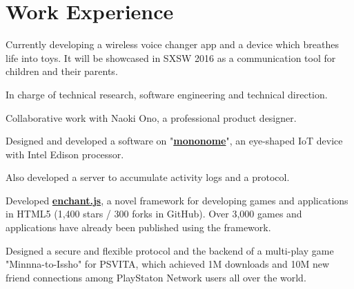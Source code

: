 \documentclass[letterpaper]{deedy-resume} %
\begin{document}
\begin{minipage}[t]{0.66\textwidth} %

\renewcommand{\baselinestretch}{0.93}


\section{Work Experience}

\vspace{4mm}
\begin{tightitemize}
\item Currently developing a wireless voice changer app and a device which breathes life into toys. It will be showcased in SXSW 2016 as a communication tool for children and their parents.
\item In charge of technical research, software engineering and technical direction.
\item Collaborative work with Naoki Ono, a professional product designer.
\end{tightitemize}

\vspace{2mm} %

\begin{tightitemize}
\item Designed and developed a software on "\textbf{\href{http://monono.me}{mononome}}", an eye-shaped IoT device with Intel Edison processor.
\item Also developed a server to accumulate activity logs and a protocol.
\end{tightitemize}

\vspace{2mm}

\begin{tightitemize}
\item Developed \textbf{\href{http://enchantjs.com/}{enchant.js}}, a novel framework for developing games and applications in HTML5 (1,400 stars / 300 forks in GitHub). Over 3,000 games and applications have already been published using the framework.
\item Designed a secure and flexible protocol and the backend of a multi-play game "Minnna-to-Issho" for PSVITA, which achieved 1M downloads and 10M new friend connections among PlayStaton Network users all over the world.
\end{tightitemize}


\end{minipage}
\end{document}
